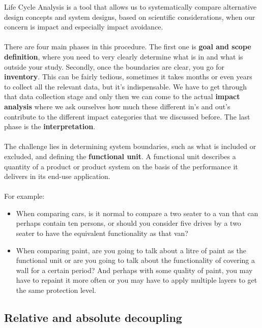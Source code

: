 \documentclass[../summary.tex]{subfiles}
\begin{document}
	Life Cycle Analysis is a tool that allows us to systematically compare alternative design concepts and system designs, based on scientific considerations, when our concern is impact and especially impact avoidance.
	\\\\
	There are four main phases in this procedure. The first one is \textbf{goal and scope definition}, where you need to very clearly determine what is in and what is outside your study. Secondly, once the boundaries are clear, you go for \textbf{inventory}. This can be fairly tedious, sometimes it takes months or even years to collect all the relevant data, but it’s indispensable. We have to get through that data collection stage and only then we can come to the actual \textbf{impact analysis} where we ask ourselves how much these different in's and out's contribute to the different impact categories that we discussed before. The last phase is the \textbf{interpretation}.
	\\\\
	The challenge lies in determining system boundaries, such as what is included or excluded, and defining the \textbf{functional unit}. A functional unit describes a quantity of a product or product system on the basis of the performance it delivers in its end-use application.
	\\\\
	For example:
	\begin{itemize}
		\item When comparing cars, is it normal to compare a two seater to a van that can perhaps contain ten persons, or should you consider five drives by a two seater to have the equivalent functionality as that van?
		\item When comparing paint, are you going to talk about a litre of paint as the functional unit or are you going to talk about the functionality of covering a wall for a certain period? And perhaps with some quality of paint, you may have to repaint it more often or you may have to apply multiple layers to get the same protection level.
	\end{itemize}
	
	
	\subsection{Relative and absolute decoupling}
	
\end{document}
